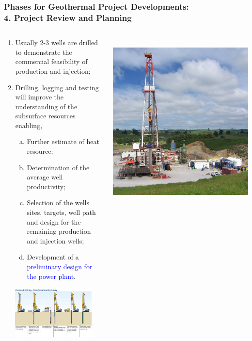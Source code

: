 \documentclass[10pt,compress]{beamer}
\newcommand{\blue}{\textcolor{blue}}
\begin{document}
\begin{frame}
 \frametitle{Phases for Geothermal Project Developments: \\ 4. Project Review and Planning}
  \begin{columns}
    \begin{column}[l]{0.45\linewidth}     
       \begin{enumerate}[{3.}1]\scriptsize
          \item <1-> Usually 2-3 wells are drilled to demonstrate the commercial feasibility of production and injection;
          \item <2-> Drilling, logging and testing will improve the understanding of the subsurface resources enabling,  
          \begin{enumerate}[(a)]\scriptsize
             \item<3-> Further estimate of heat resource;
             \item<4-> Determination of the average well productivity;
             \item<5-> Selection of the wells sites, targets, well path and design for the remaining production and injection wells;
             \item<6-> Development of a \blue{preliminary design for the power plant}.
          \end{enumerate}
       \end{enumerate}
           \includegraphics[width=5.6cm,height=2.7cm,clip]{./Pics/Uncased-Drilling-1.jpg}
    \end{column}
    \begin{column}[l]{0.55\linewidth} 
       \vbox{
          \hbox{
             \includegraphics[width=0.5\columnwidth,clip]{./Pics/Geothermal_drilling_at_Te_Mihi_NZ.jpg}
}}
\end{column}
\end{columns}
\end{frame}
\end{document}
